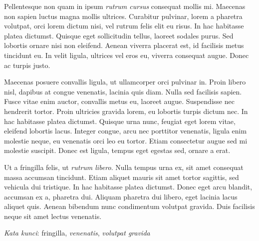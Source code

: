 \documentclass{pkl}
\begin{document}
{\abstractind

  Pellentesque non quam in ipsum \emph{rutrum cursus} consequat mollis
  mi. Maecenas non sapien luctus magna mollis ultrices. Curabitur
  pulvinar, lorem a pharetra volutpat, orci lorem dictum nisi, vel
  rutrum felis elit eu risus. In hac habitasse platea
  dictumst. Quisque eget sollicitudin tellus, laoreet sodales
  purus. Sed lobortis ornare nisi non eleifend. Aenean viverra
  placerat est, id facilisis metus tincidunt eu. In velit ligula,
  ultrices vel eros eu, viverra consequat augue. Donec ac turpis
  justo.

  Maecenas posuere convallis ligula, ut ullamcorper orci pulvinar
  in. Proin libero nisl, dapibus at congue venenatis, lacinia quis
  diam. Nulla sed facilisis sapien. Fusce vitae enim auctor, convallis
  metus eu, laoreet augue. Suspendisse nec hendrerit tortor. Proin
  ultricies gravida lorem, eu lobortis turpis dictum nec. In hac
  habitasse platea dictumst. Quisque urna nunc, feugiat eget lorem
  vitae, eleifend lobortis lacus. Integer congue, arcu nec porttitor
  venenatis, ligula enim molestie neque, eu venenatis orci leo eu
  tortor. Etiam consectetur augue sed mi molestie suscipit. Donec est
  ligula, tempus eget egestas sed, ornare a erat.

  Ut a fringilla felis, ut \emph{rutrum libero}. Nulla tempus urna ex, sit
  amet consequat massa accumsan tincidunt. Etiam aliquet mauris sit
  amet tortor sagittis, sed vehicula dui tristique. In hac habitasse
  platea dictumst. Donec eget arcu blandit, accumsan ex a, pharetra
  dui. Aliquam pharetra dui libero, eget lacinia lacus aliquet
  quis. Aenean bibendum nunc condimentum volutpat gravida. Duis
  facilisis neque sit amet lectus venenatis.

  \emph{Kata kunci}: fringilla, \emph{venenatis}, \emph{volutpat gravida}


}
\end{document}
